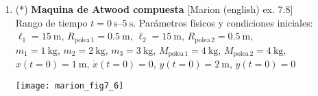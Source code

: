\documentclass[11pt, spanish, a4paper, twoside]{article}
\begin{document}
\begin{enumerate}
%





\item
\begin{minipage}[t][2cm]{0.65\textwidth}
(*) \textbf{Maquina de Atwood compuesta} [Marion (english) ex. 7.8]\\ 
Rango de tiempo \(t = \SIrange{0}{5}{\second}\).
Parámetros físicos y condiciones iniciales:\\
\(\ell_1 = \SI{15}{\metre}\), 
\(R_{\mathrm{polea}\,1} = \SI{0.5}{\metre}\), 
\(\ell_2 = \SI{15}{\metre}\), 
\(R_{\mathrm{polea}\,2} = \SI{0.5}{\metre}\),\\ 
\(m_1 = \SI{1}{\kilo\gram}\),
\(m_2 = \SI{2}{\kilo\gram}\),
\(m_3 = \SI{3}{\kilo\gram}\),
\(M_{\mathrm{polea}\,1} = \SI{4}{\kilo\gram}\),
\(M_{\mathrm{polea}\,2} = \SI{4}{\kilo\gram}\),\\
\(x(t=0) = \SI{1}{\metre}\), \(\dot{x}(t=0) = 0\),
\(y(t=0) = \SI{2}{\metre}\), \(\dot{y}(t=0) = 0\)
\end{minipage}
\begin{minipage}[c][3cm][t]{0.3\textwidth}
	\texttt{[image: marion\_fig7\_6]}
\end{minipage}




\end{enumerate}
\end{document}
